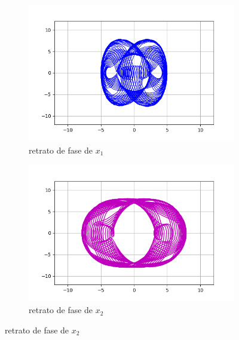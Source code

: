 \documentclass{article}
\begin{document}
\begin{figure}[ht!]
	\begin{subfigure}[b]{0.5\linewidth}
    \raggedleft
	\includegraphics[width=\linewidth]{ejercicio33-phase-x1.png}
    \caption{retrato de fase de $x_1$}
	\end{subfigure}
	\begin{subfigure}[b]{0.5\linewidth}
    \raggedright
	\includegraphics[width=\linewidth]{ejercicio33-phase-x2.png}
	\caption{retrato de fase de $x_2$}
    \end{subfigure}
\end{figure}
\end{document}
